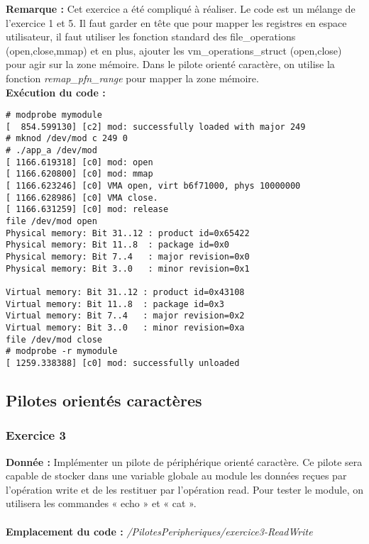 \textbf{Remarque : }Cet exercice a été compliqué à réaliser. Le code est un mélange de l'exercice 1 et 5. Il faut garder en tête que pour mapper les registres en espace utilisateur, il faut utiliser les fonction standard des file\_operations (open,close,mmap) et en plus, ajouter les vm\_operations\_struct (open,close) pour agir sur la zone mémoire. Dans le pilote orienté caractère, on utilise la fonction \textit{remap\_pfn\_range} pour mapper la zone mémoire.\\

\textbf{Exécution du code : } \\
\begin{lstlisting}
# modprobe mymodule                                                             
[  854.599130] [c2] mod: successfully loaded with major 249                     
# mknod /dev/mod c 249 0    
# ./app_a /dev/mod                                                              
[ 1166.619318] [c0] mod: open                                                   
[ 1166.620800] [c0] mod: mmap                                                   
[ 1166.623246] [c0] VMA open, virt b6f71000, phys 10000000                      
[ 1166.628986] [c0] VMA close.                                                  
[ 1166.631259] [c0] mod: release                                                
file /dev/mod open                                                              
Physical memory: Bit 31..12 : product id=0x65422                                
Physical memory: Bit 11..8  : package id=0x0                                    
Physical memory: Bit 7..4   : major revision=0x0                                
Physical memory: Bit 3..0   : minor revision=0x1                                

Virtual memory: Bit 31..12 : product id=0x43108                                 
Virtual memory: Bit 11..8  : package id=0x3                                     
Virtual memory: Bit 7..4   : major revision=0x2                                 
Virtual memory: Bit 3..0   : minor revision=0xa                                 
file /dev/mod close 
# modprobe -r mymodule                                                          
[ 1259.338388] [c0] mod: successfully unloaded   
\end{lstlisting}

\subsection{Pilotes orientés caractères}
\subsubsection{Exercice 3}
\textbf{Donnée : } Implémenter	un	pilote	de	périphérique	orienté	caractère.	Ce	pilote	sera	capable	de	stocker	dans	
une	variable	globale	au	module	les	données	reçues	par	l’opération	write et	de	les	restituer	par	
l’opération	read. Pour	tester	le	module,	on	utilisera	les commandes « echo » et	« cat ».\\\\
\textbf{Emplacement du code : } \textit{/PilotesPeripheriques/exercice3-ReadWrite}\\

